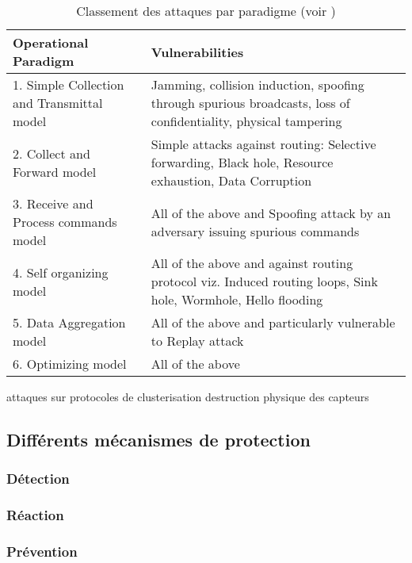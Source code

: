 \begin{table}[!ht]
    \caption{Classement des attaques par paradigme (voir )}\label{ea:tab:paradigm}
    \centering
    \medskip
    \begin{small}
        \begin{tabular}{m{}|m{}}
            \toprule
            Operational Paradigm & Vulnerabilities\\
            \midrule
            1. Simple Collection and Transmittal model & Jamming, collision induction, spoofing through spurious broadcasts, loss of confidentiality, physical tampering\\
            2. Collect and Forward model & Simple attacks against routing: Selective forwarding, Black hole, Resource exhaustion, Data Corruption\\
            3. Receive and Process commands model & All of the above and Spoofing attack by an adversary issuing spurious commands\\
            4. Self organizing model & All of the above and against routing protocol viz. Induced routing loops, Sink hole, Wormhole, Hello flooding\\
            5. Data Aggregation model & All of the above and particularly vulnerable to Replay attack\\
            6. Optimizing model & All of the above\\
            \bottomrule
         \end{tabular}
     \end{small}
\end{table}


attaques sur protocoles de clusterisation
destruction physique des capteurs



\subsection{Différents mécanismes de protection}

\subsubsection{Détection}
\subsubsection{Réaction}
\subsubsection{Prévention}

